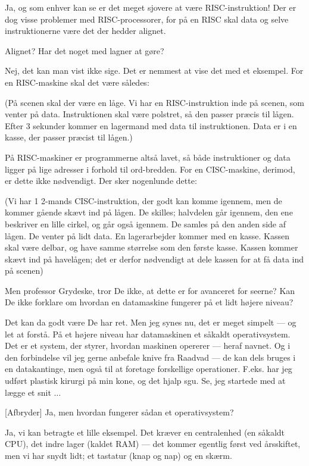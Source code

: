 \documentclass[a4paper,11pt]{article}
\begin{document}
\begin{sketch}
 Ja, og som enhver kan se er det meget sjovere at
være RISC-instruktion! Der er dog visse problemer med
RISC-processorer, for på en RISC skal data og selve instruktionerne
være det der hedder alignet.

 Alignet? Har det noget med lagner at gøre?

 Nej, det kan man vist ikke sige. Det er nemmest at
vise det med et eksempel. For en RISC-maskine skal det være således:

\scene
(På scenen skal der være en låge. Vi har en RISC-instruktion inde
på scenen, som venter på data. Instruktionen skal være polstret,
så den passer præcis til lågen. Efter 3 sekunder kommer en
lagermand med data til instruktionen. Data er i en kasse, der passer
præcist til lågen.)

 På RISC-maskiner er programmerne altså lavet,
så både instruktioner og data ligger på lige adresser i forhold til
ord-bredden. For en CISC-maskine, derimod, er dette ikke nødvendigt.
Der sker nogenlunde dette:

\scene
(Vi har 1 2-mands CISC-instruktion, der godt kan komme igennem, men de
kommer gående skævt ind på lågen. De skilles; halvdelen går
igennem, den ene beskriver en lille cirkel, og går også igennem. De
samles på den anden side af lågen. De venter på lidt data. En
lagerarbejder kommer med en kasse. Kassen skal være delbar, og have
samme størrelse som den første kasse. Kassen kommer skævt ind på
havelågen; det er derfor nødvendigt at dele kassen for at få data
ind på scenen)

 Men professor Grydeske, tror De ikke, at dette er
for avanceret for seerne? Kan De ikke forklare om hvordan en
datamaskine fungerer på et lidt højere niveau?

 Det kan da godt være De har ret. Men jeg synes nu,
det er meget simpelt --- og let at forstå. På et højere niveau har
datamaskinen et såkaldt operativsystem. Det er et system, der styrer,
hvordan maskinen opererer --- heraf navnet. Og i den forbindelse vil
jeg gerne anbefale knive fra Raadvad --- de kan dels bruges i en
datakantinge, men også til at foretage forskellige operationer.
F.eks. har jeg udført plastisk kirurgi på min kone, og det hjalp
sgu. Se, jeg startede med at lægge et snit $\ldots$

[Afbryder] Ja, men hvordan fungerer sådan et
operativsystem? 

 Ja, vi kan betragte et lille eksempel. Det kræver en
centralenhed (en såkaldt CPU), det indre lager (kaldet RAM) --- det
kommer egentlig først ved årsskiftet, men vi har snydt lidt; et
tastatur (knap og nap) og en skærm.


\end{sketch}
\end{document}
